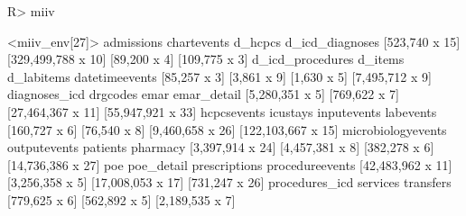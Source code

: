 \documentclass[
  notitle,
  nojss,
  noheadings]{jss}
\begin{document}
\begin{CodeChunk}
\begin{CodeInput}
R> miiv
\end{CodeInput}
\begin{CodeOutput}
<miiv_env[27]>
        admissions        chartevents            d_hcpcs    d_icd_diagnoses 
    [523,740 x 15] [329,499,788 x 10]       [89,200 x 4]      [109,775 x 3] 
  d_icd_procedures            d_items         d_labitems     datetimeevents 
      [85,257 x 3]        [3,861 x 9]        [1,630 x 5]    [7,495,712 x 9] 
     diagnoses_icd           drgcodes               emar        emar_detail 
   [5,280,351 x 5]      [769,622 x 7]  [27,464,367 x 11]  [55,947,921 x 33] 
       hcpcsevents           icustays        inputevents          labevents 
     [160,727 x 6]       [76,540 x 8]   [9,460,658 x 26] [122,103,667 x 15] 
microbiologyevents       outputevents           patients           pharmacy 
  [3,397,914 x 24]    [4,457,381 x 8]      [382,278 x 6]  [14,736,386 x 27] 
               poe         poe_detail      prescriptions    procedureevents 
 [42,483,962 x 11]    [3,256,358 x 5]  [17,008,053 x 17]     [731,247 x 26] 
    procedures_icd           services          transfers 
     [779,625 x 6]      [562,892 x 5]    [2,189,535 x 7] 
\end{CodeOutput}
\end{CodeChunk}
\end{document}
